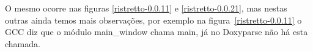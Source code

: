 O mesmo ocorre nas figuras \ref{ristretto-0.0.11} e \ref{ristretto-0.0.21}, mas
nestas outras ainda temos mais observações, por exemplo na
figura~\ref{ristretto-0.0.11} o GCC diz que o módulo main\_window chama main,
já no Doxyparse não há esta chamada.

\begin{figure}
\center
{}
\qquad
{}
\end{figure}
